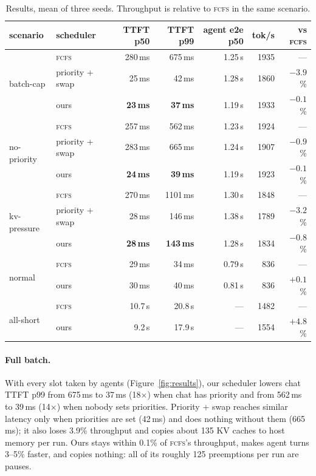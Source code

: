 \documentclass[11pt]{article}
\newcommand{\fcfs}{\textsc{fcfs}}
\begin{document}
\begin{table}[t]
\centering
\small
\caption{Results, mean of three seeds. Throughput is relative to \fcfs{} in the same scenario.}
\label{tab:main}
\begin{tabular}{llrrrrr}
\toprule
scenario & scheduler & TTFT p50 & TTFT p99 & agent e2e p50 & tok/s & vs \fcfs{} \\
\midrule
\multirow{3}{*}{batch-cap}
 & \fcfs{}          & 280\,ms & 675\,ms & 1.25\,s & 1935 & --- \\
 & priority + swap  & 25\,ms  & 42\,ms  & 1.28\,s & 1860 & $-3.9$\% \\
 & ours             & \textbf{23\,ms} & \textbf{37\,ms} & 1.19\,s & 1933 & $-0.1$\% \\
\midrule
\multirow{3}{*}{no-priority}
 & \fcfs{}          & 257\,ms & 562\,ms & 1.23\,s & 1924 & --- \\
 & priority + swap  & 283\,ms & 665\,ms & 1.24\,s & 1907 & $-0.9$\% \\
 & ours             & \textbf{24\,ms} & \textbf{39\,ms} & 1.19\,s & 1923 & $-0.1$\% \\
\midrule
\multirow{3}{*}{kv-pressure}
 & \fcfs{}          & 270\,ms & 1101\,ms & 1.30\,s & 1848 & --- \\
 & priority + swap  & 28\,ms  & 146\,ms  & 1.38\,s & 1789 & $-3.2$\% \\
 & ours             & \textbf{28\,ms} & \textbf{143\,ms} & 1.28\,s & 1834 & $-0.8$\% \\
\midrule
\multirow{2}{*}{normal}
 & \fcfs{}          & 29\,ms & 34\,ms & 0.79\,s & 836 & --- \\
 & ours             & 30\,ms & 40\,ms & 0.81\,s & 836 & $+0.1$\% \\
\midrule
\multirow{2}{*}{all-short}
 & \fcfs{}          & 10.7\,s & 20.8\,s & --- & 1482 & --- \\
 & ours             & 9.2\,s  & 17.9\,s & --- & 1554 & $+4.8$\% \\
\bottomrule
\end{tabular}
\end{table}

\paragraph{Full batch.} With every slot taken by agents (Figure~\ref{fig:results}), our scheduler
lowers chat TTFT p99 from 675\,ms to 37\,ms (18$\times$) when chat has priority and from 562\,ms to
39\,ms (14$\times$) when nobody sets priorities. Priority + swap reaches similar latency only when
priorities are set (42\,ms) and does nothing without them (665\,ms); it also loses 3.9\% throughput
and copies about 135 KV caches to host memory per run. Ours stays within 0.1\% of \fcfs{}'s
throughput, makes agent turns 3--5\% faster, and copies nothing: all of its roughly 125 preemptions
per run are pauses.
\end{document}
